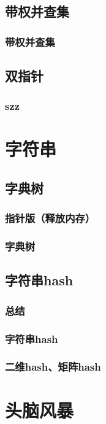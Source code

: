 \documentclass[10pt,a4paper]{article}
\begin{document}
\subsection{带权并查集}
\subsubsection{带权并查集}

\subsection{双指针}
\subsubsection{szz}

\section{字符串}
\subsection{字典树}
\subsubsection{指针版（释放内存）}

\subsubsection{字典树}

\subsection{字符串hash}
\subsubsection{总结}

\subsubsection{字符串hash}

\subsubsection{二维hash、矩阵hash}

\section{头脑风暴}
\end{document}
